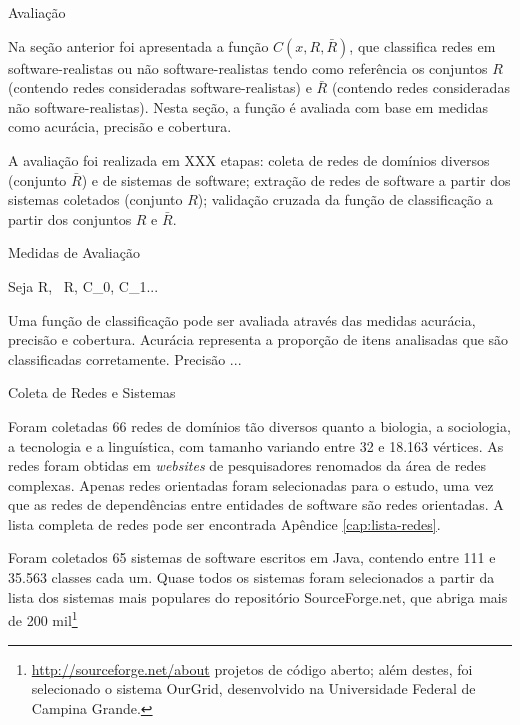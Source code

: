 \begin{section}{Avaliação}

	Na seção anterior foi apresentada a função $C(x, R, \bar{R})$, que classifica redes em software-realistas ou não software-realistas tendo como referência os conjuntos $R$ (contendo redes consideradas software-realistas) e $\bar{R}$ (contendo redes consideradas não software-realistas). Nesta seção, a função é avaliada com base em medidas como acurácia, precisão e cobertura.
	
	A avaliação foi realizada em XXX etapas: 
	coleta de redes de domínios diversos (conjunto $\bar{R}$) e de sistemas de software; 
	extração de redes de software a partir dos sistemas coletados (conjunto $R$);
	validação cruzada da função de classificação a partir dos conjuntos $R$ e $\bar{R}$.

\begin{subsection}{Medidas de Avaliação}

	Seja R, ~R, C_0, C_1...
	
	Uma função de classificação pode ser avaliada através das medidas acurácia, precisão e cobertura. Acurácia representa a proporção de itens analisadas que são classificadas corretamente. Precisão 
	...
	
	
\end{subsection}
	
\begin{subsection}{Coleta de Redes e Sistemas}

		Foram coletadas 66 redes de domínios tão diversos quanto a biologia, a sociologia, a tecnologia e a linguística, com tamanho variando entre 32 e 18.163 vértices. As redes foram obtidas em \emph{websites} de pesquisadores renomados da área de redes complexas. Apenas redes orientadas foram selecionadas para o estudo, uma vez que as redes de dependências entre entidades de software são redes orientadas. A lista completa de redes pode ser encontrada Apêndice \ref{cap:lista-redes}.

	  Foram coletados 65 sistemas de software escritos em Java, contendo entre 111 e 35.563 classes cada um. Quase todos os sistemas foram selecionados a partir da lista dos sistemas mais populares do repositório SourceForge.net, que abriga mais de 200 mil\footnote{\url{http://sourceforge.net/about} projetos de código aberto; além destes, foi selecionado o sistema OurGrid, desenvolvido na Universidade Federal de Campina Grande. 

}
\end{subsection}
\end{section}
